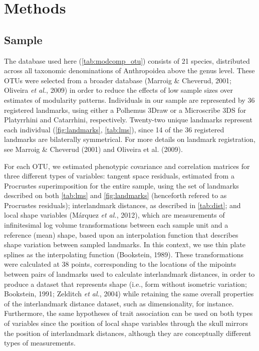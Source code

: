 \documentclass[12pt,]{article}
\begin{document}
\section{Methods}\label{methods}

\subsection{Sample}\label{sample}

The database used here (\autoref{tab:modcomp_otu}) consists of 21
species, distributed across all taxonomic denominations of Anthropoidea
above the genus level. These OTUs were selected from a broader database
(Marroig \& Cheverud, 2001; Oliveira \emph{et al.}, 2009) in order to
reduce the effects of low sample sizes over estimates of modularity
patterns. Individuals in our sample are represented by 36 registered
landmarks, using either a Polhemus 3Draw or a Microscribe 3DS for
Platyrrhini and Catarrhini, respectively. Twenty-two unique landmarks
represent each individual (\autoref{fig:landmarks}, \autoref{tab:lms}),
since 14 of the 36 registered landmarks are bilaterally symmetrical. For
more details on landmark registration, see Marroig \& Cheverud (2001)
and Oliveira et al. (2009).



For each OTU, we estimated phenotypic covariance and correlation
matrices for three different types of variables: tangent space
residuals, estimated from a Procrustes superimposition for the entire
sample, using the set of landmarks described on both \autoref{tab:lms}
and \autoref{fig:landmarks} (henceforth refered to as Procrustes
residuals); interlandmark distances, as described in \autoref{tab:dist};
and local shape variables (Márquez \emph{et al.}, 2012), which are
measurements of infinitesimal log volume transformations between each
sample unit and a reference (mean) shape, based upon an interpolation
function that describes shape variation between sampled landmarks. In
this context, we use thin plate splines as the interpolating function
(Bookstein, 1989). These transformations were calculated at 38 points,
corresponding to the locations of the mipoints between pairs of
landmarks used to calculate interlandmark distances, in order to produce
a dataset that represents shape (i.e., form without isometric variation;
Bookstein, 1991; Zelditch \emph{et al.}, 2004) while retaining the same
overall properties of the interlandmark distance dataset, such as
dimensionality, for instance. Furthermore, the same hypotheses of trait
association can be used on both types of variables since the position of
local shape variables through the skull mirrors the position of
interlandmark distances, although they are conceptually different types
of measurements.
\end{document}
